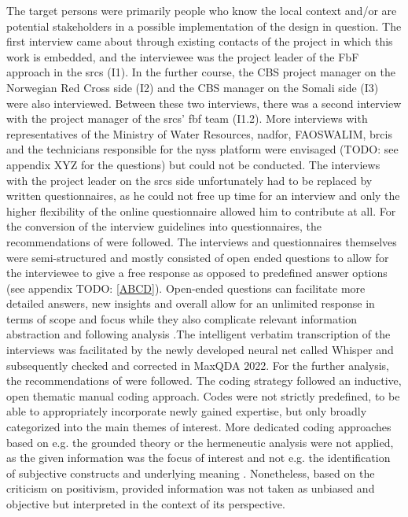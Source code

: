 The target persons were primarily people who know the local context and/or are potential stakeholders in a possible implementation of the design in question. The first interview came about through existing contacts of the project in which this work is embedded, and the interviewee was the project leader of the FbF approach in the \acrshort{srcs} (I1). In the further course, the CBS project manager on the Norwegian Red Cross side (I2) and the CBS manager on the Somali side (I3) were also interviewed. Between these two interviews, there was a second interview with the project manager of the \acrshort{srcs}' \acrshort{fbf} team (I1.2). More interviews with representatives of the Ministry of Water Resources, \acrshort{nadfor}, FAOSWALIM, \acrshort{brcis} and the technicians responsible for the \acrshort{nyss} platform were envisaged (TODO: see appendix XYZ for the questions) but could not be conducted. The interviews with the project leader on the \acrshort{srcs} side unfortunately had to be replaced by written questionnaires, as he could not free up time for an interview and only the higher flexibility of the online questionnaire allowed him to contribute at all. For the conversion of the interview guidelines into questionnaires, the recommendations of \autocite{harknessCCSGQuestionnaireDesign2016} were followed. The interviews and questionnaires themselves were semi-structured and mostly consisted of open ended questions to allow for the interviewee to give a free response as opposed to predefined answer options (see appendix TODO: \ref*{ABCD}). Open-ended questions can facilitate more detailed answers, new insights and overall allow for an unlimited response in terms of scope and focus while they also complicate relevant information abstraction and following analysis \autocite{pelzResearchMethodsSocial}.\linebreak[1]
The intelligent verbatim transcription of the interviews was facilitated by the newly developed neural net called Whisper \autocite{openaiIntroducingWhisper2022,openaiWhisper2023} and subsequently checked and corrected in MaxQDA 2022. For the further analysis, the recommendations of \autocite{radikerFocusedAnalysisQualitative2020} were followed. The coding strategy followed an inductive, open thematic manual coding approach. Codes were not strictly predefined, to be able to appropriately incorporate newly gained expertise, but only broadly categorized into the main themes of interest. More dedicated coding approaches based on e.g. the grounded theory or the hermeneutic analysis were not applied, as the given information was the focus of interest and not e.g. the identification of subjective constructs and underlying meaning \autocite{pelzResearchMethodsSocial}. Nonetheless, based on the criticism on positivism, provided information was not taken as unbiased and objective but interpreted in the context of its perspective.


